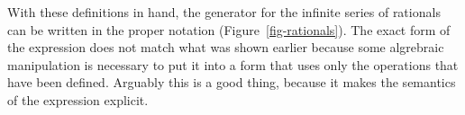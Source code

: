 With these definitions in hand, the generator for the infinite series of rationals can be written in the proper notation (Figure~\ref{fig-rationals}). The exact form of the expression does not match what was shown earlier because some algrebraic manipulation is necessary to put it into a form that uses only the operations that have been defined. Arguably this is a good thing, because it makes the semantics of the expression explicit.
